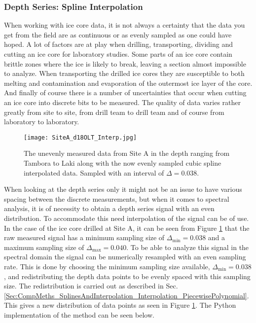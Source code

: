 \documentclass[../../CompleteThesis/Complete_1stDraft.tex]{subfiles}
\begin{document}
	\subsubsection[Spline Interpolation]{Depth Series: Spline Interpolation}
	\label{Subsubsec:Method_FirstSigmaEstimate_BackDiffusion_SplineInterp}
	When working with ice core data, it is not always a certainty that the data you get from the field are as continuous or as evenly sampled as one could have hoped. A lot of factors are at play when drilling, transporting, dividing and cutting an ice core for laboratory studies. Some parts of an ice core contain brittle zones where the ice is likely to break, leaving a section almost impossible to analyze. When transporting the drilled ice cores they are susceptible to both melting and contamination and evaporation of the outermost ice layer of the core. And finally of course there is a number of uncertainties that occur when cutting an ice core into discrete bits to be measured. The quality of data varies rather greatly from site to site, from drill team to drill team and of course from laboratory to laboratory. \\
	\begin{figure}[h]
		\centering
		\texttt{[image: SiteA\_d18OLT\_Interp.jpg]}
		\caption[Measured and interpolated $\delta^{18}$O data, Site A]{The unevenly measured data from Site A in the depth ranging from Tambora to Laki along with the now evenly sampled cubic spline interpolated data. Sampled with an interval of $\Delta = 0.038$.}
		\label{fig:SiteA_d18OLT_Interp}
	\end{figure}
	When looking at the depth series only it might not be an issue to have various spacing between the discrete measurements, but when it comes to spectral analysis, it is of necessity to obtain a depth series signal with an even distribution. To accommodate this need interpolation of the signal can be of use. In the case of the ice core drilled at Site A, it can be seen from Figure \ref{fig:SiteA_d18OLT_Interp} that the raw measured signal has a minimum sampling size of $\Delta_{\text{min}}=0.038$ and a maximum sampling size of $\Delta_{\text{max}}=0.040$. To be able to analyze this signal in the spectral domain the signal can be numerically resampled with an even sampling rate. This is done by choosing the minimum sampling size available, $\Delta_{\text{min}}=0.038$, and redistributing the depth data points to be evenly spaced with this sampling size. The redistribution is carried out as described in Sec. \ref{Sec:CompMeths_SplinesAndInterpolation_Interpolation_PiecewisePolynomial}.
	This gives a new distribution of data points as seen in Figure \ref{fig:SiteA_d18OLT_Interp}. The Python implementation of the method can be seen below.
	
\end{document}

